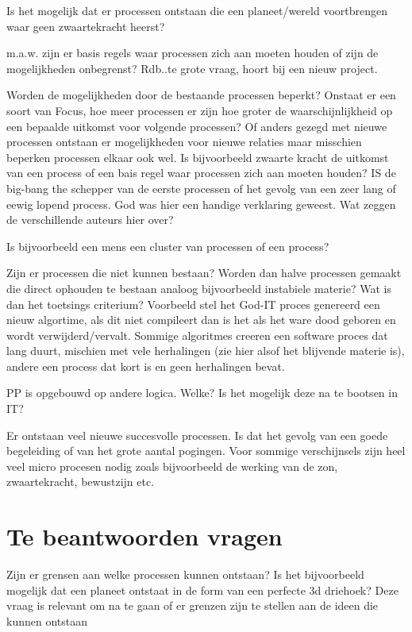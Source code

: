 \documentclass[a4paper]{Thesis}
\begin{document}
Is het mogelijk dat er processen ontstaan die een planeet/wereld voortbrengen waar geen zwaartekracht heerst?

m.a.w. zijn er basis regels waar processen zich aan moeten houden of zijn de mogelijkheden onbegrenst? 
Rdb..te grote vraag, hoort bij een nieuw project.

Worden de mogelijkheden door de bestaande processen beperkt? Onstaat er een soort van Focus, hoe meer processen er zijn hoe groter de waarschijnlijkheid op een bepaalde uitkomst voor volgende processen? Of anders gezegd met nieuwe processen ontstaan er mogelijkheden voor nieuwe relaties maar misschien beperken processen elkaar ook wel.
Is bijvoorbeeld zwaarte kracht de uitkomst van een process of een bais regel waar processen zich aan moeten houden?
IS de big-bang the schepper van de eerste processen of het gevolg van een zeer lang of eewig lopend process. God was hier een handige verklaring geweest.
Wat zeggen de verschillende auteurs hier over?

Is bijvoorbeeld een mens een cluster van processen of een process?

Zijn er processen die niet kunnen bestaan? Worden dan halve processen gemaakt die direct ophouden te bestaan analoog bijvoorbeeld instabiele materie?
Wat is dan het toetsings criterium? Voorbeeld stel het God-IT proces genereerd een nieuw algortime, als dit niet compileert dan is het als het ware dood geboren en wordt verwijderd/vervalt. Sommige algoritmes creeren een software proces dat lang duurt, mischien met vele herhalingen (zie hier alsof het blijvende materie is), andere een process dat kort is en geen herhalingen bevat.

PP is opgebouwd op andere logica. Welke? Is het mogelijk deze na te bootsen in IT?

Er ontstaan veel nieuwe succesvolle processen. Is dat het gevolg van een goede begeleiding of van het grote aantal pogingen. Voor sommige verschijnsels zijn heel veel micro procesen nodig zoals bijvoorbeeld de werking van de zon, zwaartekracht, bewustzijn etc.

\section{Te beantwoorden vragen}
Zijn er grensen aan welke processen kunnen ontstaan? Is het bijvoorbeeld mogelijk dat een planeet ontstaat in de form van een perfecte 3d driehoek?
Deze vraag is relevant om na te gaan of er grenzen zijn te stellen aan de ideen die kunnen ontstaan
\end{document}

